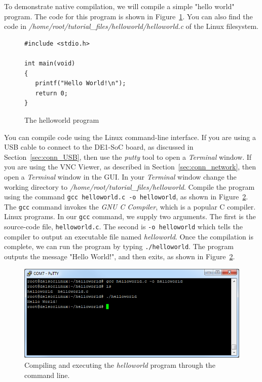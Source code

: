 \documentclass[11pt, twoside, pdftex]{article}
\begin{document}
To demonstrate native compilation, we will compile a simple "hello world" program. The code 
for this program is shown in Figure~\ref{fig:helloworld_code}. You can also find the code 
in \textit{/home/root/tutorial\_files/helloworld/helloworld.c} of the Linux filesystem.

\lstset{language=C,numbers=left}
\begin{figure}[H]
\begin{center}
\begin{minipage}[t]{16 cm}
\begin{lstlisting}
#include <stdio.h>

int main(void)
{
   printf("Hello World!\n");
   return 0;
}
\end{lstlisting}
\end{minipage}
\end{center}
\vspace{-0.33in}\caption{The helloworld program}
\label{fig:helloworld_code}
\end{figure}

You can compile code using the Linux command-line interface. If you are using a USB cable
to connect to the DE1-SoC board, as discussed in Section~\ref{sec:conn_USB}, then use the
{\it putty} tool to open a {\it Terminal} window. If you are using the VNC Viewer, as 
described in Section~\ref{sec:conn_network}, then open a {\it Terminal} window in the GUI. 
In your {\it Terminal} window change the working directory to 
\textit{/home/root/tutorial\_files/helloworld}. 
Compile the program using the command \texttt{gcc helloworld.c -o helloworld}, as 
shown in Figure~\ref{fig:helloworld_native}. The \texttt{gcc} command invokes 
the \textit{GNU C Compiler}, which is a popular C compiler.
Linux programs. In our \texttt{gcc} command, we supply two arguments. The first is the source-code 
file, \texttt{helloworld.c}. The second is \texttt{-o helloworld} which 
tells the compiler to output an executable file named \textit{helloworld}. Once the compilation 
is complete, we can run the program by typing \texttt{./helloworld}. The program outputs the 
message "Hello World!", and then exits, as shown in Figure~\ref{fig:helloworld_native}.
~\\
\begin{figure}[H]
   \begin{center}
       \includegraphics[scale=0.7]{figures/compilation_1}
   \end{center}
   \caption{Compiling and executing the \textit{helloworld} program through the command line.}
	\label{fig:helloworld_native}
\end{figure}
\end{document}
